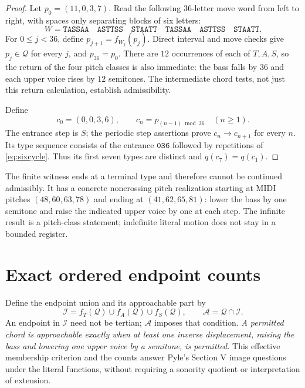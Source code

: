 \documentclass[11pt,letterpaper]{article}
\theoremstyle{definition}\newtheorem{definition}[theorem]{Definition}
\newcommand{\Q}{\mathcal Q}
\newcommand{\I}{\mathcal I}
\newcommand{\Aset}{\mathcal A}
\newcommand{\typ}[1]{\mathtt{#1}}
\begin{document}
\begin{proof}
Let $p_0=(11,0,3,7)$. Read the following $36$-letter move word from left to right, with spaces only separating blocks of six letters:
\begin{equation}\label{eq:word}
 W=\mathtt{TASSAA}\quad\mathtt{ASTTSS}\quad
 \mathtt{STAATT}\quad\mathtt{TASSAA}\quad
 \mathtt{ASTTSS}\quad\mathtt{STAATT}.
\end{equation}
For $0\leq j<36$, define $p_{j+1}=f_{W_j}(p_j)$. Direct interval and move checks give $p_j\in\Q$ for every $j$, and $p_{36}=p_0$. There are $12$ occurrences of each of $T,A,S$, so the return of the four pitch classes is also immediate: the bass falls by $36$ and each upper voice rises by $12$ semitones. The intermediate chord tests, not just this return calculation, establish admissibility.

Define
\[
 c_0=(0,0,3,6),\qquad c_n=p_{(n-1)\bmod36}\quad(n\geq1).
\]
The entrance step is $S$; the periodic step assertions prove $c_n\to c_{n+1}$ for every $n$. Its type sequence consists of the entrance $\typ{036}$ followed by repetitions of \eqref{eq:sixcycle}. Thus its first seven types are distinct and $q(c_7)=q(c_1)$.
\end{proof}

The finite witness ends at a terminal type and therefore cannot be continued admissibly. It has a concrete noncrossing pitch realization starting at MIDI pitches $(48,60,63,78)$ and ending at $(41,62,65,81)$: lower the bass by one semitone and raise the indicated upper voice by one at each step. The infinite result is a pitch-class statement; indefinite literal motion does not stay in a bounded register.

\clearpage
\section{Exact ordered endpoint counts}
Define the endpoint union and its approachable part by
\[
 \I=f_T(\Q)\cup f_A(\Q)\cup f_S(\Q),\qquad
 \Aset=\Q\cap\I.
\]
An endpoint in $\I$ need not be tertian; $\Aset$ imposes that condition. \emph{A permitted chord is approachable exactly when at least one inverse displacement, raising the bass and lowering one upper voice by a semitone, is permitted.} This effective membership criterion and the counts answer Pyle's Section V image questions under the literal functions, without requiring a sonority quotient or interpretation of extension.
\end{document}
